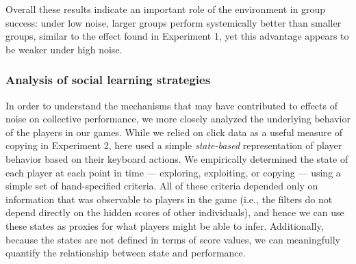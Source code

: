 \documentclass[12pt,letterpaper]{article}
\begin{document}
Overall these results indicate an important role of the environment in group success: under low noise, larger groups perform systemically better than smaller groups, similar to the effect found in Experiment 1, yet this advantage appears to be weaker under high noise.

\subsubsection{Analysis of social learning strategies}

In order to understand the mechanisms that may have contributed to effects of noise on collective performance, we more closely analyzed the underlying behavior of the players in our games.
While we relied on click data as a useful measure of copying in Experiment 2, here used a simple \emph{state-based} representation of player behavior based on their keyboard actions.
We empirically determined the state of each player at each point in time --- exploring, exploiting, or copying --- using a simple set of hand-specified criteria.
All of these criteria depended only on information that was observable to players in the game (i.e., the filters do not depend directly on the hidden scores of other individuals), and hence we can use these states as proxies for what players might be able to infer.
Additionally, because the states are not defined in terms of score values, we can meaningfully quantify the relationship between state and performance.
\end{document}
